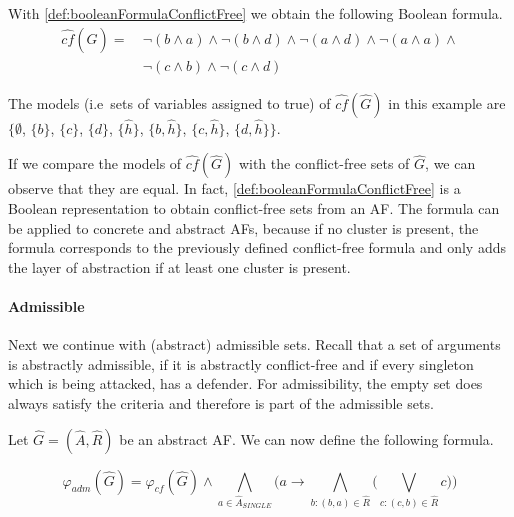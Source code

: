 \begin{example}
With \cref{def:booleanFormulaConflictFree} we obtain the following Boolean formula.
\begin{align*}
    \hat{cf}(\hat{G}) =\ &
    \lnot(b \land a)  \land
    \lnot(b \land d)  \land
    \lnot(a \land d)  \land
    \lnot(a \land a)  \land
    \\
    & \lnot(c \land b)  \land
    \lnot(c \land d)
\end{align*}

The models (i.e\ sets of variables assigned to true) of $\hat{cf}(\hat{G})$ in this example are $\bigl\{\emptyset$, $\{b\}$, $\{c\}$, $\{d\}$, $\{\hat{h}\}$, $\{b, \hat{h}\}$, $\{c, \hat{h}\}$, $\{d, \hat{h}\}\bigl\}$.
\end{example}

If we compare the models of $\hat{cf}(\hat{G})$ with the conflict-free sets of $\hat{G}$, we can observe that they are equal. In fact, \cref{def:booleanFormulaConflictFree} is a Boolean representation to obtain conflict-free sets from an AF. The formula can be applied to concrete and abstract AFs, because if no cluster is present, the formula corresponds to the previously defined conflict-free formula and only adds the layer of abstraction if at least one cluster is present.


\paragraph{Admissible} Next we continue with (abstract) admissible sets. Recall that a set of arguments is abstractly admissible, if it is abstractly conflict-free and if every singleton which is being attacked, has a defender. For admissibility, the empty set does always satisfy the criteria and therefore is part of the admissible sets.

\begin{definition}
    Let $\hat{G}=(\hat{A}, \hat{R})$ be an abstract AF. We can now define the following formula.
    \begin{center}
        \[ \varphi_{adm}(\hat{G})=
        \varphi_{cf}(\hat{G}) \land  \bigwedge_{a \in \hat{A}_{\!S\!I\!N\!G\!L\!E}} \big( a \rightarrow \bigwedge_{b:(b,a) \in \hat{R}} \big( \bigvee_{c:(c,b) \in \hat{R}} c\big) \big)
        \]
    \end{center}
    \label{def:booleanFormulaAdmissible}
\end{definition}


